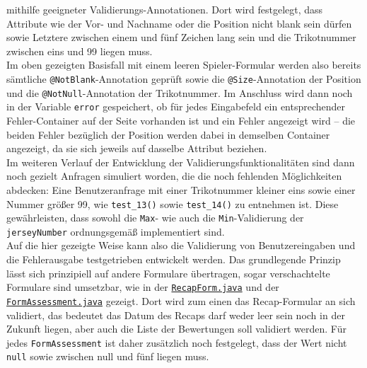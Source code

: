 mithilfe geeigneter Validierungs-Annotationen. 
Dort wird festgelegt, dass Attribute wie der Vor- und Nachname oder die Position 
nicht blank sein dürfen sowie Letztere zwischen einem und fünf Zeichen lang sein 
und die Trikotnummer zwischen eins und 99 liegen muss. \\ 
Im oben gezeigten Basisfall mit einem leeren Spieler-Formular werden also bereits 
sämtliche \texttt{@NotBlank}-Annotation geprüft sowie die \texttt{@Size}-Annotation 
der Position und die \texttt{@NotNull}-Annotation der Trikotnummer. Im Anschluss wird 
dann noch in der Variable \texttt{error} gespeichert, ob für jedes Eingabefeld 
ein entsprechender Fehler-Container auf der Seite vorhanden ist und ein Fehler 
angezeigt wird -- die beiden Fehler bezüglich der Position werden dabei in demselben 
Container angezeigt, da sie sich jeweils auf dasselbe Attribut beziehen. \\ 
Im weiteren Verlauf der Entwicklung der Validierungsfunktionalitäten sind dann noch 
gezielt Anfragen simuliert worden, die die noch fehlenden Möglichkeiten abdecken: 
Eine Benutzeranfrage mit einer Trikotnummer kleiner eins sowie einer Nummer größer 99, 
wie \texttt{test\_13()} sowie \texttt{test\_14()} zu entnehmen ist. Diese gewährleisten, 
dass sowohl die \texttt{Max}- wie auch die \texttt{Min}-Validierung der 
\texttt{jerseyNumber} ordnungsgemäß implementiert sind. \\ 
Auf die hier gezeigte Weise kann also die Validierung von Benutzereingaben und die 
Fehlerausgabe testgetrieben entwickelt werden. Das grundlegende Prinzip lässt sich 
prinzipiell auf andere Formulare übertragen, sogar verschachtelte Formulare sind 
umsetzbar, wie in der 
\href{https://github.com/FlorianOhmes/bat_spielzeitenplaner/blob/main/spielzeitenplaner/src/main/java/de/bathesis/spielzeitenplaner/web/forms/RecapForm.java}{\texttt{RecapForm.java}} 
und der 
\href{https://github.com/FlorianOhmes/bat_spielzeitenplaner/blob/main/spielzeitenplaner/src/main/java/de/bathesis/spielzeitenplaner/web/forms/FormAssessment.java}{\texttt{FormAssessment.java}} 
gezeigt. Dort wird zum einen das Recap-Formular an sich validiert, das bedeutet 
das Datum des Recaps darf weder leer sein noch in der Zukunft liegen, aber auch 
die Liste der Bewertungen soll validiert werden. Für jedes \texttt{FormAssessment} 
ist daher zusätzlich noch festgelegt, dass der Wert nicht \texttt{null} sowie 
zwischen null und fünf liegen muss. 

